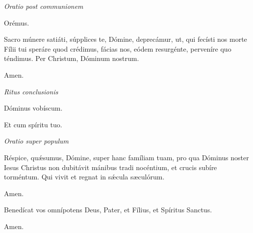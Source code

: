 \textit{Oratio post communionem}

Orémus.

Sacro múnere satiáti, súpplices te, Dómine, deprecámur, ut, qui fecísti nos morte Fílii tui speráre quod crédimus, fácias nos, eódem resurgénte, perveníre quo téndimus. Per Christum, Dóminum nostrum.

\Rbardot{} Amen.

\mbox{}

\textit{Ritus conclusionis}

\Vbardot{} Dóminus vobíscum.

\Rbardot{} Et cum spíritu tuo.

\textit{Oratio super populum}

Réspice, quǽsumus, Dómine, super hanc famíliam tuam, pro qua Dóminus noster Iesus Christus non dubitávit mánibus tradi nocéntium, et crucis subíre torméntum. Qui vivit et regnat in sǽcula sæculórum.

\Rbardot{} Amen.

Benedícat vos omnípotens Deus, Pater, et Fílius, \grecross{} et Spíritus Sanctus.

\Rbardot{} Amen.
